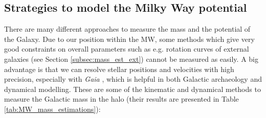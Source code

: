 \subsection{Strategies to model the Milky Way potential}\label{subsec:mass_est_MW}
There are many different approaches to measure the mass and the potential of the Galaxy. Due to our position within the \ac{MW}, some methods which give very good constraints on overall parameters such as e.g. rotation curves of external galaxies (see Section \ref{subsec:mass_est_ext}) cannot be measured as easily. A big advantage is that we can resolve stellar positions and velocities with high precision, especially with \textit{Gaia} \citep{Gaia...mission...2016, GaiaDR2...overview...2018, GaiaDR...GCs...2018}, which is helpful in both Galactic archaeology and dynamical modelling. These are some of the kinematic and dynamical methods to measure the Galactic mass in the halo (their results are presented in Table \ref{tab:MW_mass_estimations}):
